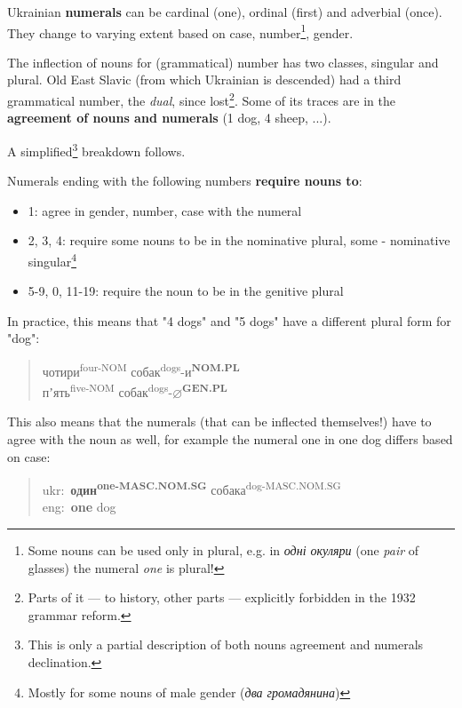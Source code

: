 Ukrainian \textbf{numerals} can be cardinal (one), ordinal (first) and
adverbial (once). They change to varying extent based on case,
number\footnote{Some nouns can be used only in plural, e.g. in
  \emph{одні окуляри} (one \emph{pair} of glasses) the numeral
  \emph{one} is plural!}, gender.

The inflection of nouns for (grammatical) number has two classes,
singular and plural. Old East Slavic (from which Ukrainian is descended)
had a third grammatical number, the \emph{dual}, since lost\footnote{Parts
  of it --- to history, other parts --- explicitly forbidden in the 1932
  grammar reform.}. Some of its traces are in the \textbf{agreement of
nouns and numerals} (1 dog, 4 sheep, ...).

A simplified\footnote{This is only a partial description of both nouns
  agreement and numerals declination.} breakdown follows.

Numerals ending with the following numbers \textbf{require nouns to}:

\begin{itemize}
\tightlist
\item
  1: agree in gender, number, case with the numeral
\item
  2, 3, 4: require some nouns to be in the nominative plural, some -
  nominative singular\footnote{Mostly for some nouns of male gender
    (\emph{два громадянина})}
\item
  5-9, 0, 11-19: require the noun to be in the genitive plural
\end{itemize}

In practice, this means that "4 dogs" and "5 dogs" have a different
plural form for "dog":

\begin{quote}
чотири\textsuperscript{four-NOM}
собак\textsuperscript{dogs}-и\textsuperscript{\textbf{NOM.PL}}\\
пʼять\textsuperscript{five-NOM}
собак\textsuperscript{dogs}-\(\varnothing\)\textsuperscript{\textbf{GEN.PL}}
\end{quote}

This also means that the numerals (that can be inflected themselves!)
have to agree with the noun as well, for example the numeral
\textquotesingle one\textquotesingle{} in \textquotesingle one
dog\textquotesingle{} differs based on case:

\begin{quote}
ukr: \textbf{один\textsuperscript{one-MASC.NOM.SG}}
собака\textsuperscript{dog-MASC.NOM.SG}\\
eng: \textbf{one} dog
\end{quote}

